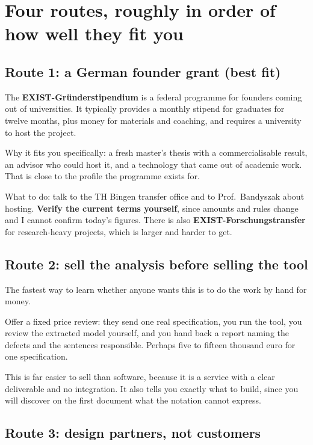 \documentclass[11pt,a4paper]{article}
\begin{document}
\section{Four routes, roughly in order of how well they fit you}

\subsection{Route 1: a German founder grant (best fit)}

The \textbf{EXIST-Gr\"understipendium} is a federal programme for founders coming out of
universities. It typically provides a monthly stipend for graduates for twelve months,
plus money for materials and coaching, and requires a university to host the project.

Why it fits you specifically: a fresh master's thesis with a commercialisable result, an
advisor who could host it, and a technology that came out of academic work. That is
close to the profile the programme exists for.

What to do: talk to the TH Bingen transfer office and to Prof.\ Bandyszak about hosting.
\textbf{Verify the current terms yourself}, since amounts and rules change and I cannot
confirm today's figures. There is also \textbf{EXIST-Forschungstransfer} for
research-heavy projects, which is larger and harder to get.

\subsection{Route 2: sell the analysis before selling the tool}

The fastest way to learn whether anyone wants this is to do the work by hand for money.

Offer a fixed price review: they send one real specification, you run the tool, you
review the extracted model yourself, and you hand back a report naming the defects and
the sentences responsible. Perhaps five to fifteen thousand euro for one specification.

This is far easier to sell than software, because it is a service with a clear
deliverable and no integration. It also tells you exactly what to build, since you will
discover on the first document what the notation cannot express.

\subsection{Route 3: design partners, not customers}
\end{document}
